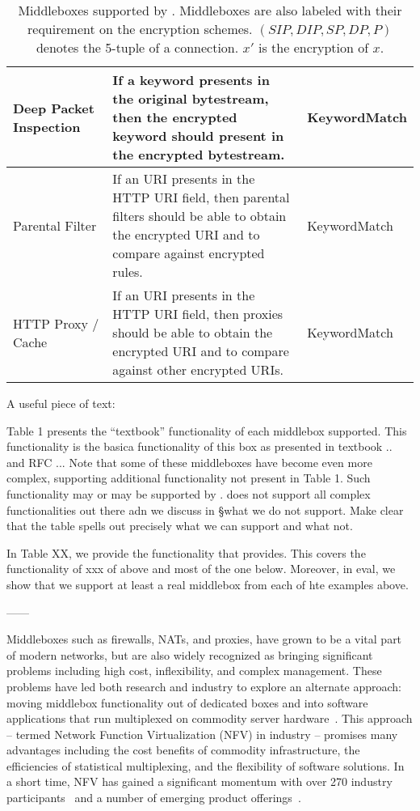 \begin{table*}[t]
\begin{tabular}{l | p{8.8cm} | l}
Deep Packet Inspection~\cite{blindbox} &
If a keyword presents in the original bytestream, then the encrypted keyword should present in the encrypted bytestream.
&
KeywordMatch \\ \hline

Parental Filter &
If an URI presents in the HTTP URI field, then parental filters should be able to obtain the encrypted URI and to compare against encrypted rules.
 &
KeywordMatch \\ \hline

HTTP Proxy / Cache~\cite{rfc3040, haproxy, squid} &
If an URI presents in the HTTP URI field, then proxies should be able to obtain the encrypted URI and to compare against other encrypted URIs.
&
KeywordMatch \\ \hline

\end{tabular}
\caption[]{Middleboxes supported by \sys. Middleboxes are also labeled with their requirement on the encryption schemes. $(SIP, DIP, SP, DP, P)$ denotes the 5-tuple of a connection. $x'$ is the encryption of $x$.\label{tbl:mbreqs}} 
\end{table*}


A useful piece of text:

Table 1 presents the ``textbook'' functionality of each middlebox supported. This functionality is the basica functionality
of this box as presented in textbook .. and RFC ...
Note that some of these middleboxes have become even more complex, supporting additional functionality not present in
Table 1. Such functionality may or may be supported by \sys. \sys does not support all complex functionalities out there adn we discuss in \S what we do not support. Make clear that the table spells out precisely what we can support and what not. 

In Table XX, we provide the functionality that \sys provides. This covers the functionality of xxx of above and most of the one
below. Moreover, in eval, we show that we support at least a real middlebox from each of hte examples above. 

------



Middleboxes such as firewalls, NATs, and proxies, have grown to be a vital part of modern networks, but are 
also widely recognized as bringing significant problems including high cost, inflexibility, and complex management.  
These problems have led both research and industry to explore an alternate approach: moving middlebox functionality out of dedicated boxes and into 
software applications that run multiplexed on commodity server hardware~\cite{mb-manifesto,comb,aplomb,opennf,clickos,flowtags,etsi-nfv,domain20,opnfv}.
This approach -- termed Network Function Virtualization (NFV) in industry -- promises many advantages including the cost benefits of commodity infrastructure, 
the efficiencies of statistical multiplexing, and the flexibility of software solutions. 
In a short time, NFV has gained a significant momentum with over 270 industry participants~\cite{etsi-nfv} and a number of emerging product offerings~\cite{brocade,dell,juniper}.


